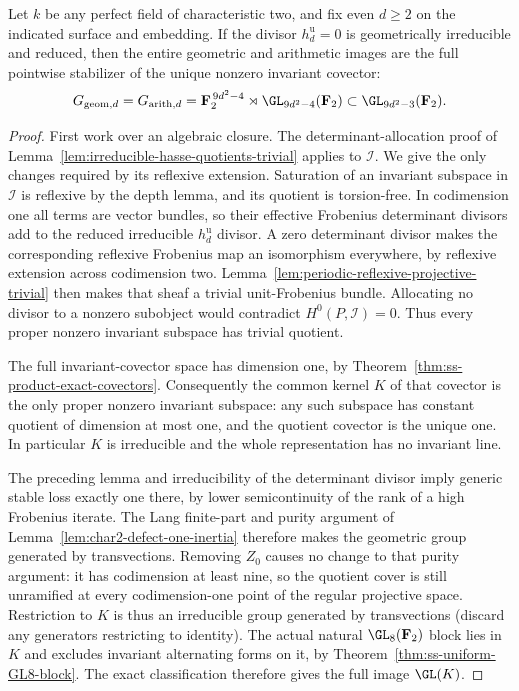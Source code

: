 \begin{theorem}
\label{thm:ss-even-full-group-if-unit-Hasse-irreducible-candidate}
Let $k$ be any perfect field of characteristic two, and fix even
$d\ge2$ on the indicated surface and embedding. If the divisor
$h_d^{\mathrm u}=0$ is
geometrically irreducible and reduced, then the entire geometric
and arithmetic images are the full pointwise stabilizer of the
unique nonzero invariant covector:
\[
 G_{\mathrm{geom},d}=G_{\mathrm{arith},d}
   =\mathbf F_2^{\,9d^2-4}\rtimes\GL_{9d^2-4}(\mathbf F_2)
       \subset\GL_{9d^2-3}(\mathbf F_2).
\]
\end{theorem}

\begin{proof}
First work over an algebraic closure. The determinant-allocation
proof of Lemma~\ref{lem:irreducible-hasse-quotients-trivial}
applies to $\mathcal I$. We give the only changes required by
its reflexive extension. Saturation of an invariant subspace in
$\mathcal I$ is reflexive by the depth lemma, and its quotient
is torsion-free. In codimension one all terms are vector bundles,
so their effective Frobenius determinant divisors add to the
reduced irreducible $h_d^{\mathrm u}$ divisor. A zero determinant
divisor makes the corresponding reflexive Frobenius map an
isomorphism everywhere, by reflexive extension across codimension
two. Lemma~\ref{lem:periodic-reflexive-projective-trivial} then
makes that sheaf a trivial unit-Frobenius bundle.
Allocating no divisor to a nonzero subobject would contradict
$H^0(P,\mathcal I)=0$. Thus every proper nonzero invariant
subspace has trivial quotient.

The full invariant-covector space has dimension one, by
Theorem~\ref{thm:ss-product-exact-covectors}.
Consequently the common kernel $K$ of that covector is the
only proper nonzero invariant subspace: any such subspace has
constant quotient of dimension at most one, and the quotient
covector is the unique one. In particular $K$ is irreducible
and the whole representation has no invariant line.

The preceding lemma and irreducibility of the determinant
divisor imply generic stable loss exactly one there, by lower
semicontinuity of the rank of a high Frobenius iterate.
The Lang finite-part and purity argument of
Lemma~\ref{lem:char2-defect-one-inertia} therefore makes the
geometric group generated by transvections. Removing $Z_0$
causes no change to that purity argument: it has codimension
at least nine, so the quotient cover is still unramified at
every codimension-one point of the regular projective space.
Restriction to $K$ is thus an irreducible group generated by
transvections (discard any generators restricting to identity).
The actual natural $\GL_8(\mathbf F_2)$ block lies in $K$ and
excludes invariant alternating forms on it, by
Theorem~\ref{thm:ss-uniform-GL8-block}.
The exact classification
\cite[Theorem~3.6, printed p.~22]{KantorSeress2001}
therefore gives the full image $\GL(K)$.


\end{proof}
